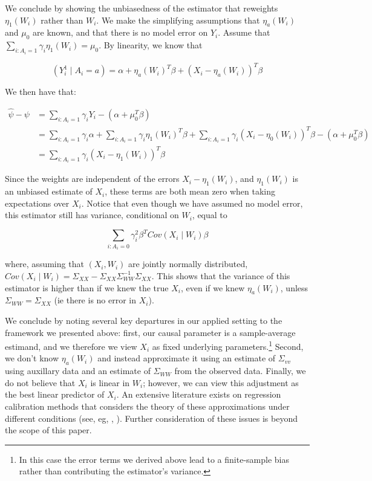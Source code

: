 \documentclass[12pt]{article}
\begin{document}
We conclude by showing the unbiasedness of the estimator that reweights $\eta_1(W_i)$ rather than $W_i$. We make the simplifying assumptions that $\eta_a(W_i)$ and $\mu_0$ are known, and that there is no model error on $Y_i$. Assume that $\sum_{i: A_i = 1}\gamma_i\eta_1(W_i) = \mu_0$. By linearity, we know that

$$
(Y_i^1 \mid A_i = a) = \alpha + \eta_a(W_i)^T\beta + (X_i - \eta_a(W_i))^T\beta
$$

We then have that:

\begin{align*}
    \hat{\psi} - \psi &= \sum_{i: A_i = 1}\gamma_iY_i - (\alpha + \mu_0^T\beta) \\
    &= \sum_{i: A_i = 1}\gamma_i\alpha + \sum_{i: A_i = 1}\gamma_i\eta_1(W_i)^T\beta + \sum_{i: A_i = 1}\gamma_i(X_i - \eta_0(W_i))^T\beta - (\alpha + \mu_0^T\beta) \\
    &= \sum_{i: A_i = 1}\gamma_i(X_i - \eta_1(W_i))^T\beta
\end{align*}

Since the weights are independent of the errors $X_i - \eta_1(W_i)$, and $\eta_1(W_i)$ is an unbiased estimate of $X_i$, these terms are both mean zero when taking expectations over $X_i$. Notice that even though we have assumed no model error, this estimator still has variance, conditional on $W_i$, equal to

$$
\sum_{i: A_i = 0} \gamma_i^2\beta^TCov(X_i \mid W_i)\beta
$$

where, assuming that $(X_i, W_i)$ are jointly normally distributed, $Cov(X_i \mid W_i) = \Sigma_{XX} - \Sigma_{XX}\Sigma_{WW}^{-1}\Sigma_{XX}$. This shows that the variance of this estimator is higher than if we knew the true $X_i$, even if we knew $\eta_a(W_i)$, unless $\Sigma_{WW} = \Sigma_{XX}$ (ie there is no error in $X_i$). 

We conclude by noting several key departures in our applied setting to the framework we presented above: first, our causal parameter is a sample-average estimand, and we therefore we view $X_i$ as fixed underlying parameters.\footnote{In this case the error terms we derived above lead to a finite-sample bias rather than contributing the estimator's variance.} Second, we don't know $\eta_a(W_i)$ and instead approximate it using an estimate of $\Sigma_{vv}$ using auxillary data and an estimate of $\Sigma_{WW}$ from the observed data. Finally, we do not believe that $X_i$ is linear in $W_i$; however, we can view this adjustment as the best linear predictor of $X_i$. An extensive literature exists on regression calibration methods that considers the theory of these approximations under different conditions (see, eg, \cite{gleser1992importance}, \cite{carroll2006measurement}). Further consideration of these issues is beyond the scope of this paper.
\end{document}
